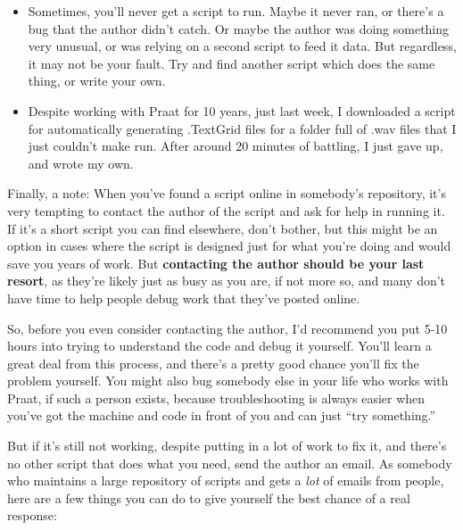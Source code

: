 \begin{enumerate}
  \begin{itemize}
  \tightlist
  \item
    Sometimes, you'll never get a script to run. Maybe it never ran, or
    there's a bug that the author didn't catch. Or maybe the author was
    doing something very unusual, or was relying on a second script to
    feed it data. But regardless, it may not be your fault. Try and find
    another script which does the same thing, or write your own.
  \item
    Despite working with Praat for 10 years, just last week, I
    downloaded a script for automatically generating .TextGrid files for
    a folder full of .wav files that I just couldn't make run. After
    around 20 minutes of battling, I just gave up, and wrote my own.
  \end{itemize}
\end{enumerate}

Finally, a note: When you've found a script online in somebody's
repository, it's very tempting to contact the author of the script and
ask for help in running it. If it's a short script you can find
elsewhere, don't bother, but this might be an option in cases where the
script is designed just for what you're doing and would save you years
of work. But \textbf{contacting the author should be your last resort},
as they're likely just as busy as you are, if not more so, and many
don't have time to help people debug work that they've posted online.

So, before you even consider contacting the author, I'd recommend you
put 5-10 hours into trying to understand the code and debug it yourself.
You'll learn a great deal from this process, and there's a pretty good
chance you'll fix the problem yourself. You might also bug somebody else
in your life who works with Praat, if such a person exists, because
troubleshooting is always easier when you've got the machine and code in
front of you and can just ``try something.''

But if it's still not working, despite putting in a lot of work to fix
it, and there's no other script that does what you need, send the author
an email. As somebody who maintains a large repository of scripts and
gets a \emph{lot} of emails from people, here are a few things you can
do to give yourself the best chance of a real response:

